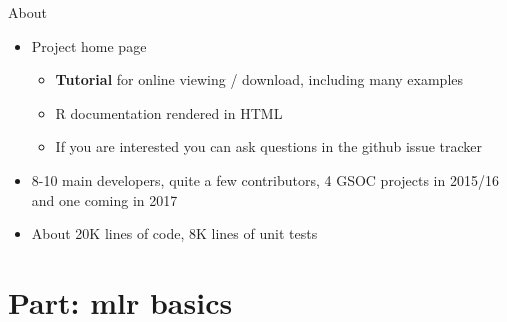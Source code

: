 \begin{vframe}{About}
  \begin{itemize}
    \item Project home page\\
      \begin{itemize}
        \item \textbf{Tutorial} for online viewing / download, including many examples
        \item R documentation rendered in HTML
        \item If you are interested you can ask questions in the github issue tracker
      \end{itemize}
    \item 8-10 main developers, quite a few contributors, 4 GSOC projects in 2015/16 and 
    one coming in 2017
    \item About 20K lines of code, 8K lines of unit tests
  \end{itemize}
\end{vframe}


\section{Part: mlr basics}

% 



